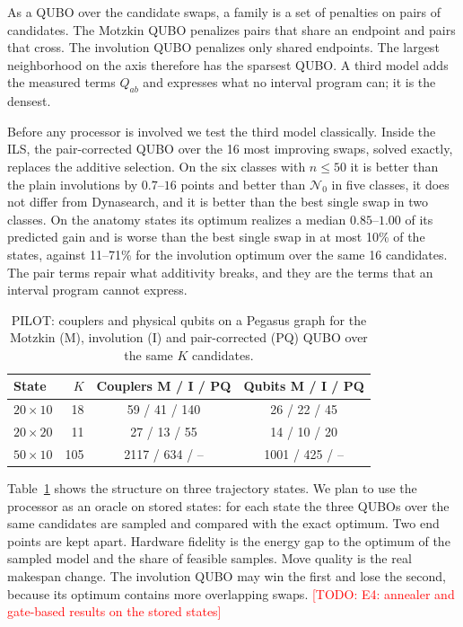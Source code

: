 \documentclass{article}
\newcommand{\todo}[1]{\textcolor{red}{[TODO: #1]}}
\newcommand{\N}{\mathcal{N}}
\begin{document}
As a QUBO over the candidate swaps, a family is a set of penalties on
pairs of candidates. The Motzkin QUBO penalizes pairs that share an
endpoint and pairs that cross. The involution QUBO penalizes only shared
endpoints. The largest neighborhood on the axis therefore has the
sparsest QUBO. A third model adds the measured terms $Q_{ab}$ and
expresses what no interval program can; it is the densest.

Before any processor is involved we test the third model classically.
Inside the ILS, the pair-corrected QUBO over the 16 most improving
swaps, solved exactly, replaces the additive selection. On the six
classes with $n\leq50$ it is better than the plain involutions by
$0.7$--$16$ points and better than $\N_0$ in five classes, it does not
differ from Dynasearch, and it is better than the best single swap in
two classes. On the anatomy states its optimum realizes a median
$0.85$--$1.00$ of its predicted gain and is worse than the best single
swap in at most 10\% of the states, against 11--71\% for the involution
optimum over the same 16 candidates. The pair terms repair what
additivity breaks, and they are the terms that an interval program
cannot express.

\begin{table}[t]
\centering
\caption{PILOT: couplers and physical qubits on a Pegasus graph for the
Motzkin (M), involution (I) and pair-corrected (PQ) QUBO over the same
$K$ candidates.}
\label{tab:qubo}
\small
\begin{tabular}{@{}lrcc@{}}
\toprule
State & $K$ & Couplers M / I / PQ & Qubits M / I / PQ \\
\midrule
$20\times10$ & 18 & 59 / 41 / 140 & 26 / 22 / 45 \\
$20\times20$ & 11 & 27 / 13 / 55 & 14 / 10 / 20 \\
$50\times10$ & 105 & 2117 / 634 / -- & 1001 / 425 / -- \\
\bottomrule
\end{tabular}
\end{table}

Table~\ref{tab:qubo} shows the structure on three trajectory states. We
plan to use the processor as an oracle on stored states: for each state
the three QUBOs over the same candidates are sampled and compared with
the exact optimum. Two end points are kept apart. Hardware fidelity is
the energy gap to the optimum of the sampled model and the share of
feasible samples. Move quality is the real makespan change. The
involution QUBO may win the first and lose the second, because its
optimum contains more overlapping swaps. \todo{E4: annealer and
gate-based results on the stored states}
\end{document}
